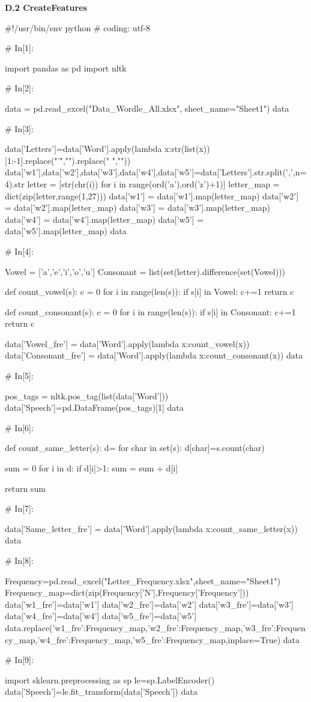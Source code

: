 \documentclass{MathModeling}
\begin{document}
\newpage
\textbf{D.2 CreateFeatures}
\begin{python}
#!/usr/bin/env python
# coding: utf-8

# In[1]:


import pandas as pd
import nltk


# In[2]:


data = pd.read_excel("Data_Wordle_All.xlsx", sheet_name="Sheet1")
data


# In[3]:


data['Letters']=data['Word'].apply(lambda x:str(list(x))[1:-1].replace("'","").replace(" ",""))
data['w1'],data['w2'],data['w3'],data['w4'],data['w5']=data['Letters'].str.split(',',n=4).str
letter = [str(chr(i)) for i in range(ord('a'),ord('z')+1)]
letter_map = dict(zip(letter,range(1,27)))
data['w1'] = data['w1'].map(letter_map)
data['w2'] = data['w2'].map(letter_map)
data['w3'] = data['w3'].map(letter_map)
data['w4'] = data['w4'].map(letter_map)
data['w5'] = data['w5'].map(letter_map)
data


# In[4]:


Vowel = ['a','e','i','o','u']
Consonant = list(set(letter).difference(set(Vowel)))


def count_vowel(s):
    c = 0
    for i in range(len(s)):
        if s[i] in Vowel:
            c+=1
    return c


def count_consonant(s):
    c = 0
    for i in range(len(s)):
        if s[i] in Consonant:
            c+=1
    return c


data['Vowel_fre'] = data['Word'].apply(lambda x:count_vowel(x))
data['Consonant_fre'] = data['Word'].apply(lambda x:count_consonant(x))
data


# In[5]:


pos_tags = nltk.pos_tag(list(data['Word']))
data['Speech']=pd.DataFrame(pos_tags)[1]
data


# In[6]:


def count_same_letter(s):
    d={}
    for char in set(s):
        d[char]=s.count(char)

    sum = 0
    for i in d:
        if d[i]>1:
            sum = sum + d[i]

    return sum


# In[7]:


data['Same_letter_fre'] = data['Word'].apply(lambda x:count_same_letter(x))
data


# In[8]:


Frequency=pd.read_excel("Letter_Frequency.xlsx",sheet_name="Sheet1")
Frequency_map=dict(zip(Frequency['N'],Frequency['Frequency']))
data['w1_fre']=data['w1']
data['w2_fre']=data['w2']
data['w3_fre']=data['w3']
data['w4_fre']=data['w4']
data['w5_fre']=data['w5']
data.replace({'w1_fre':Frequency_map,'w2_fre':Frequency_map,'w3_fre':Frequency_map,'w4_fre':Frequency_map,'w5_fre':Frequency_map},inplace=True)
data


# In[9]:


import sklearn.preprocessing as sp
le=sp.LabelEncoder()
data['Speech']=le.fit_transform(data['Speech'])
data


\end{python}
\end{document}

